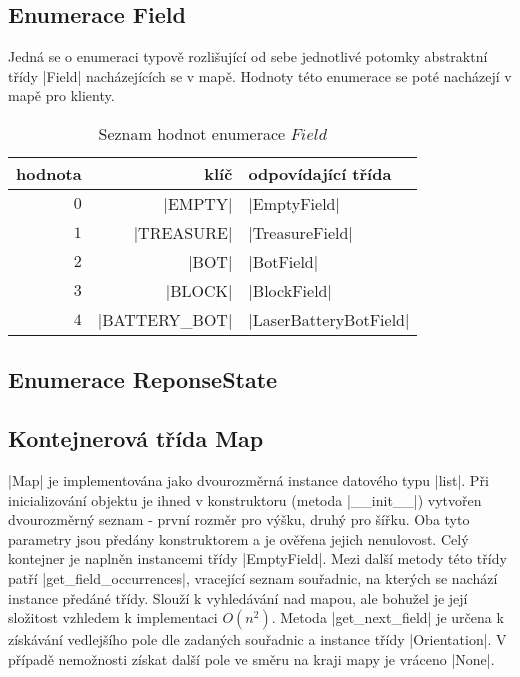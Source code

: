 \subsection{Enumerace Field}

Jedná se o enumeraci typově rozlišující od sebe jednotlivé potomky abstraktní třídy \ic|Field| nacházejících se v mapě. Hodnoty této enumerace se poté nacházejí v mapě pro klienty.

\begin{table}[H]
	\begin{tabular}{ r r | l }
		hodnota & klíč & odpovídající třída \\
		\hline
		$0$ & \ic|EMPTY| & \ic|EmptyField| \\
		$1$ & \ic|TREASURE| & \ic|TreasureField| \\
		$2$ & \ic|BOT| & \ic|BotField| \\
		$3$ & \ic|BLOCK| & \ic|BlockField| \\
		$4$ & \ic|BATTERY_BOT| & \ic|LaserBatteryBotField| \\
	\end{tabular}
	\caption{Seznam hodnot enumerace $Field$}
	\label{table:field-enum-values}
\end{table}

\subsection{Enumerace ReponseState}


\subsection{Kontejnerová třída Map}

\ic|Map| je implementována jako dvourozměrná instance datového typu \ic|list|. Při inicializování objektu je ihned v konstruktoru (metoda \ic|__init__|) vytvořen dvourozměrný seznam - první rozměr pro výšku, druhý pro šířku. Oba tyto parametry jsou předány konstruktorem a je ověřena jejich nenulovost. Celý kontejner je naplněn instancemi třídy \ic|EmptyField|. Mezi další metody této třídy patří \ic|get_field_occurrences|, vracející seznam souřadnic, na kterých se nachází instance předáné třídy. Slouží k vyhledávání nad mapou, ale bohužel je její složitost vzhledem k implementaci $O(n^2)$. Metoda \ic|get_next_field| je určena k získávání vedlejšího pole dle zadaných souřadnic a instance třídy \ic|Orientation|. V případě nemožnosti získat další pole ve směru na kraji mapy je vráceno \ic|None|. 

